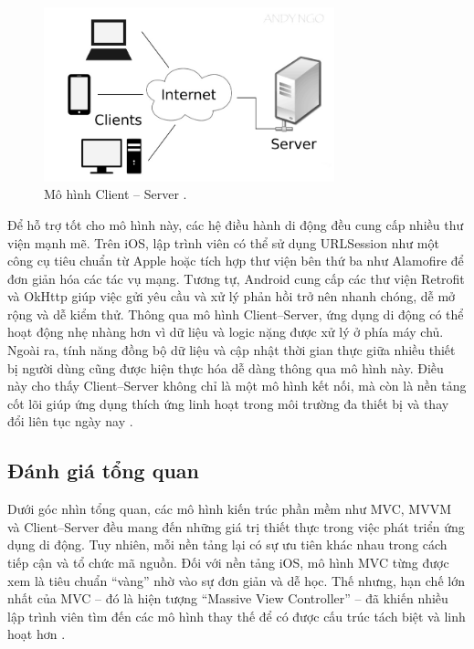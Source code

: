 \begin{figure}[H]
    \centering
    \includegraphics[width=0.75\textwidth]{images/client-server.jpg}
    \caption{Mô hình Client – Server \cite{codelearnClientServer}.}
    \label{fig:fig14}
  \end{figure}

    
      \hspace*{0.8cm}Để hỗ trợ tốt cho mô hình này, các hệ điều hành di động đều cung cấp nhiều thư viện mạnh mẽ. Trên iOS, lập trình viên có thể sử dụng URLSession như một công cụ tiêu chuẩn từ Apple hoặc tích hợp thư viện bên thứ ba như Alamofire để đơn giản hóa các tác vụ mạng. Tương tự, Android cung cấp các thư viện Retrofit và OkHttp giúp việc gửi yêu cầu và xử lý phản hồi trở nên nhanh chóng, dễ mở rộng và dễ kiểm thử. Thông qua mô hình Client–Server, ứng dụng di động có thể hoạt động nhẹ nhàng hơn vì dữ liệu và logic nặng được xử lý ở phía máy chủ. Ngoài ra, tính năng đồng bộ dữ liệu và cập nhật thời gian thực giữa nhiều thiết bị người dùng cũng được hiện thực hóa dễ dàng thông qua mô hình này. Điều này cho thấy Client–Server không chỉ là một mô hình kết nối, mà còn là nền tảng cốt lõi giúp ứng dụng thích ứng linh hoạt trong môi trường đa thiết bị và thay đổi liên tục ngày nay \cite{scalable_mobile_arch}.
    

\subsection{Đánh giá tổng quan}
\renewcommand{\labelitemi}{--}    
    
        \hspace*{0.8cm}Dưới góc nhìn tổng quan, các mô hình kiến trúc phần mềm như MVC, MVVM và Client–Server đều mang đến những giá trị thiết thực trong việc phát triển ứng dụng di động. Tuy nhiên, mỗi nền tảng lại có sự ưu tiên khác nhau trong cách tiếp cận và tổ chức mã nguồn. Đối với nền tảng iOS, mô hình MVC từng được xem là tiêu chuẩn “vàng” nhờ vào sự đơn giản và dễ học. Thế nhưng, hạn chế lớn nhất của MVC – đó là hiện tượng “Massive View Controller” – đã khiến nhiều lập trình viên tìm đến các mô hình thay thế để có được cấu trúc tách biệt và linh hoạt hơn \cite{massive_view_controller}.
    

